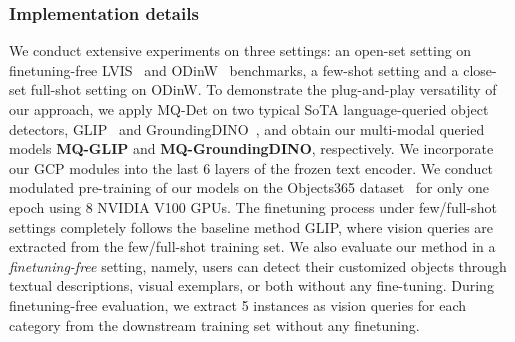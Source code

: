 \subsubsection{Implementation details}
\label{sec:implement_detail}
We conduct extensive experiments on three settings: an open-set setting on finetuning-free LVIS~\cite{lvis} and ODinW~\cite{elevater} benchmarks, a few-shot setting and a close-set full-shot setting on ODinW. 
To demonstrate the plug-and-play versatility of our approach, we apply MQ-Det on two typical SoTA language-queried object detectors, GLIP~\cite{glip} and GroundingDINO~\cite{groundingdino}, and obtain our multi-modal queried models \textbf{MQ-GLIP} and \textbf{MQ-GroundingDINO}, respectively. We incorporate our GCP modules into the last 6 layers of the frozen text encoder.
We conduct modulated pre-training of our models on the Objects365 dataset~\cite{objects365} for only one epoch using 8 NVIDIA V100 GPUs. The finetuning process under few/full-shot settings completely follows the baseline method GLIP, where vision queries are extracted from the few/full-shot training set.
We also evaluate our method in a \textit{finetuning-free} setting, namely, users can detect their customized objects through textual descriptions, visual exemplars, or both without any fine-tuning. During finetuning-free evaluation, we extract 5 instances as vision queries for each category from the downstream training set without any finetuning.



